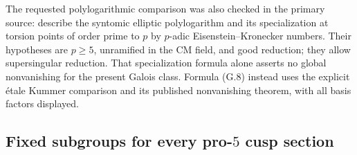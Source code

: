 The requested polylogarithmic comparison was also checked in the
primary source: \citet[Theorems 4.19 and 5.7, the latter also
Theorem 0.4]{BannaiKobayashiTsuji2010} describe the syntomic elliptic
polylogarithm and its specialization at torsion points of order
prime to $p$ by $p$-adic Eisenstein--Kronecker numbers. Their
hypotheses are $p\ge5$, unramified in the CM field, and good
reduction; they allow supersingular reduction. That specialization
formula alone asserts no global nonvanishing for the present
Galois class. Formula (G.8) instead uses the explicit étale
Kummer comparison and its published nonvanishing theorem, with
all basis factors displayed.

\subsection{Fixed subgroups for every pro-$5$ cusp section}


